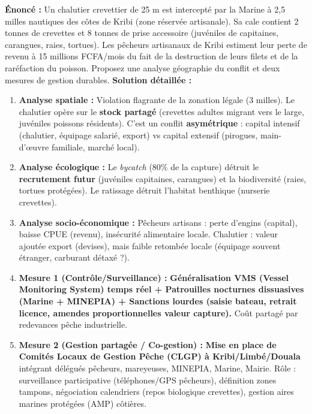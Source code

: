 \documentclass[11pt]{article}
\begin{document}
\begin{exoresolu}
\textbf{Énoncé :} Un chalutier crevettier de 25 m est intercepté par la Marine à 2,5 milles nautiques des côtes de Kribi (zone réservée artisanale). Sa cale contient 2 tonnes de crevettes et 8 tonnes de prise accessoire (juvéniles de capitaines, carangues, raies, tortues). Les pêcheurs artisanaux de Kribi estiment leur perte de revenu à 15 millions FCFA/mois du fait de la destruction de leurs filets et de la raréfaction du poisson. Proposez une analyse géographie du conflit et deux mesures de gestion durables.
\tcblower
\textbf{Solution détaillée :}
\begin{enumerate}
\item \textbf{Analyse spatiale :} Violation flagrante de la zonation légale (3 milles). Le chalutier opère sur le \textbf{stock partagé} (crevettes adultes migrant vers le large, juvéniles poissons résidents). C'est un conflit \textbf{asymétrique} : capital intensif (chalutier, équipage salarié, export) vs capital extensif (pirogues, main-d'œuvre familiale, marché local).
\item \textbf{Analyse écologique :} Le \emph{bycatch} (80\% de la capture) détruit le \textbf{recrutement futur} (juvéniles capitaines, carangues) et la biodiversité (raies, tortues protégées). Le ratissage détruit l'habitat benthique (nurserie crevettes).
\item \textbf{Analyse socio-économique :} Pêcheurs artisans : perte d'engins (capital), baisse CPUE (revenu), insécurité alimentaire locale. Chalutier : valeur ajoutée export (devises), mais faible retombée locale (équipage souvent étranger, carburant détaxé ?).
\item \textbf{Mesure 1 (Contrôle/Surveillance) :} \textbf{Généralisation VMS (Vessel Monitoring System) temps réel + Patrouilles nocturnes dissuasives (Marine + MINEPIA) + Sanctions lourdes (saisie bateau, retrait licence, amendes proportionnelles valeur capture).} Coût partagé par redevances pêche industrielle.
\item \textbf{Mesure 2 (Gestion partagée / Co-gestion) :} \textbf{Mise en place de Comités Locaux de Gestion Pêche (CLGP) à Kribi/Limbé/Douala} intégrant délégués pêcheurs, mareyeuses, MINEPIA, Marine, Mairie. Rôle : surveillance participative (téléphones/GPS pêcheurs), définition zones tampons, négociation calendriers (repos biologique crevettes), gestion aires marines protégées (AMP) côtières.
\end{enumerate}
\end{exoresolu}
\end{document}

